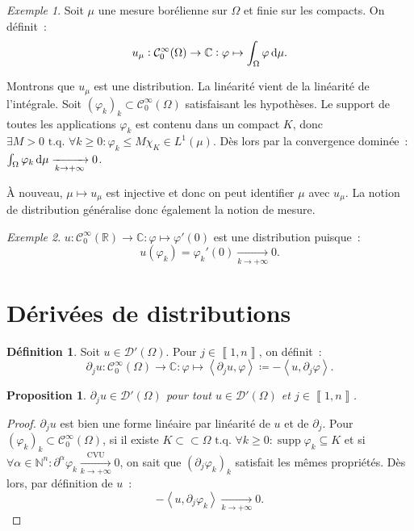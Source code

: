 \documentclass{report}
\DeclareMathOperator{\supp}{supp}
\newcommand{\C}{{\mathbb C}}
\newcommand{\R}{{\mathbb R}}
\newcommand{\N}{{\mathbb N}}
\newcommand{\scpr}[2]{\left\langle#1, #2\right\rangle}
\newcommand{\tq}{\text{ t.q. }}
\newcommand{\st}{\tq}
\newcommand{\pinfty}{{+\infty}}
\newcommand{\intint}[2]{{\left\llbracket#1, #2\right\rrbracket}}
\newtheorem{prp}[thm]{Proposition}
\theoremstyle{definition}
\newtheorem{déf}[thm]{Définition}
\theoremstyle{remark}
\newtheorem{ex}{Exemple}[chapter]
\begin{document}
\begin{ex}
Soit $\mu$ une mesure borélienne sur $\Omega$ et finie sur les compacts. On définit~:
\[u_\mu : \mathcal C^\infty_0(\Omega) \to \C : \varphi \mapsto \int_\Omega\varphi\dif\mu.\]

Montrons que $u_\mu$ est une distribution. La linéarité vient de la linéarité de l'intégrale. Soit $(\varphi_k)_k \subset \mathcal C^\infty_0(\Omega)$ satisfaisant les hypothèses.
Le support de toutes les applications $\varphi_k$ est contenu dans un compact $K$, donc $\exists M > 0 \st \forall k \geq 0 : \varphi_k \leq M\chi_K \in L^1(\mu)$.
Dès lors par la convergence dominée~: $\int_\Omega\varphi_k\dif\mu \xrightarrow[k \to \pinfty]{} 0$.

À nouveau, $\mu \mapsto u_\mu$ est injective et donc on peut identifier $\mu$ avec $u_\mu$. La notion de distribution généralise donc également la notion de mesure.
\end{ex}

\begin{ex}
$u : \mathcal C^\infty_0(\R) \to \C : \varphi \mapsto \varphi'(0)$ est une distribution puisque~:
\[u(\varphi_k) = \varphi_k'(0) \xrightarrow[k \to \pinfty]{} 0.\]
\end{ex}

\section{Dérivées de distributions}

\begin{déf} Soit $u \in \mathcal D'(\Omega)$. Pour $j \in \intint 1n$, on définit~:
\[\partial_ju : \mathcal C^\infty_0(\Omega) \to \C : \varphi \mapsto \scpr {\partial_ju}\varphi \coloneqq -\scpr u{\partial_j\varphi}.\]
\end{déf}

\begin{prp}\label{prp:dérivation distribution} $\partial_ju \in \mathcal D'(\Omega)$ pour tout $u \in \mathcal D'(\Omega)$ et $j \in \intint 1n$.
\end{prp}

\begin{proof} $\partial_ju$ est bien une forme linéaire par linéarité de $u$ et de $\partial_j$. Pour $(\varphi_k)_k \subset \mathcal C^\infty_0(\Omega)$, si il existe
$K \subset\subset \Omega \st \forall k \geq 0 : \supp \varphi_k \subseteq K$ et si $\forall \alpha \in \N^n : \partial^\alpha\varphi_k \xrightarrow[k \to \pinfty]{\text{CVU}} 0$,
on sait que $(\partial_j\varphi_k)_k$ satisfait les mêmes propriétés. Dès lors, par définition de $u$~:
\[-\scpr u{\partial_j\varphi_k} \xrightarrow[k \to \pinfty]{} 0.\]
\end{proof}
\end{document}
